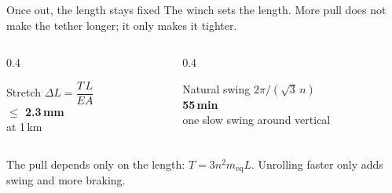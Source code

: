 \documentclass[aspectratio=169,11pt]{beamer}
\newcommand{\meq}{m_{\mathrm{eq}}}
\begin{document}
\begin{frame}{Once out, the length stays fixed}
The winch sets the length. More pull does not make the tether longer; it only makes it tighter.
\vspace{0.3cm}
\begin{columns}[T]
\begin{column}{0.4\textwidth}
\begin{block}{Stretch}
\centering
$\Delta L = \dfrac{T\,L}{EA}$\\[4pt]
{\Large\bfseries $\le$ 2.3\,mm}\\[2pt]
\footnotesize at 1\,km
\end{block}
\end{column}
\begin{column}{0.4\textwidth}
\begin{block}{Natural swing}
\centering
$2\pi/(\sqrt{3}\,n)$\\[4pt]
{\Large\bfseries 55\,min}\\[2pt]
\footnotesize one slow swing around vertical
\end{block}
\end{column}
\end{columns}
\vspace{0.4cm}
The pull depends only on the length: $T = 3n^{2}\meq L$. Unrolling faster only adds swing and more braking.
\end{frame}
\end{document}
